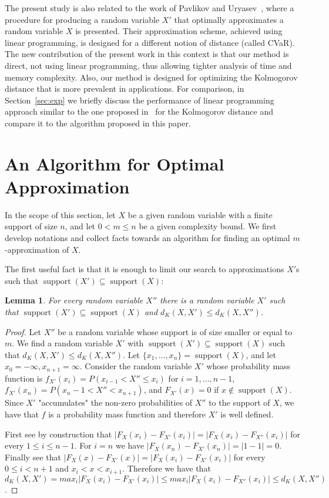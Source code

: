 \documentclass{article}
\newtheorem{lemma}[thm]{Lemma}
\DeclareMathOperator{\support}{support}
\begin{document}
The present study is also related to the work of Pavlikov and Uryasev~\cite{pavlikov2016cvar}, where a procedure for producing a random variable $X'$ that optimally approximates a random variable $X$ is presented. Their approximation scheme, achieved using linear programming, is designed for a different notion of distance (called CVaR). The new contribution of the present work in this context is that our method is direct, not using linear programming, thus allowing tighter analysis of time and memory complexity. Also, our method is designed for optimizing the Kolmogorov distance that is more prevalent in applications. For comparison, in Section~\ref{sec:exp} we briefly discuss the performance of linear programming approach similar to the one proposed in~\cite{pavlikov2016cvar} for the Kolmogorov distance and compare it to the algorithm proposed in this paper. 

\section{An Algorithm for Optimal Approximation}\label{sec:alg}
In the scope of this section, let $X$ be a given random variable with a finite support of size $n$, and let  $0<m\leq n$ be a given complexity bound. We first develop notations and collect facts towards an algorithm for finding an optimal $m$-approximation of $X$.

The first useful fact is that it is enough to limit our search to approximations $X'$s such that $\support(X') \subseteq \support(X)$:

\begin{lemma}\label{lem:supContained}
	For every random variable $X''$ there is a random variable $X'$ such that $\support(X') \subseteq \support(X)$ and $d_{K}(X,X')\leq d_{K}(X,X'')$.
\end{lemma}

\begin{proof}
	
	
	Let $X''$ be a random variable whose support is of size smaller or equal to $m$. We find a random variable $X'$ with $\support(X') \subseteq \support(X)$ such that $d_{K}(X,X')\leq d_{K}(X,X'')$.
	Let $\{x_1,\dots,x_n\} = \support(X)$, and let $x_0 = -\infty, x_{n+1}=\infty$. Consider the random variable $X'$ whose probability mass function is
	$f_{X'}(x_i) = P(x_{i-1} < X'' \leq x_i)$ for $i=1,\dots,n-1$,  $f_{X'}(x_n) = P(x_n-1 < X'' < x_{n+1})$, and $F_{X'}(x)=0$ if $x\notin \support(X)$.  Since $X'$ "accumulates" the non-zero probabilities of $X''$ to the support of $X$, we have that $f$ is a probability mass function and therefore $X'$ is well defined.
	
	First see by construction that $|F_{X}(x_i)-F_{X'}(x_i)| = |F_{X}(x_i)-F_{X''}(x_i)|$ for every  $1\leq i\leq n-1$. For $i=n$ we have $|F_{X}(x_n)-F_{X'}(x_n)| = |1-1|=0$.
	Finally see that   $|F_{X}(x)-F_{X'}(x)| = |F_{X}(x_i)-F_{X'}(x_i)|$ for every  $0\leq   i < n+1$  and $x_i<x<x_{i+1}$. Therefore we have that $d_K(X,X')=max_{i}|F_{X}(x_i)-F_{X'}(x_i)|\leq max_{i}|F_{X}(x_i)-F_{X''}(x_i)|\leq d_K(X,X'')$.
\end{proof}
\end{document}
